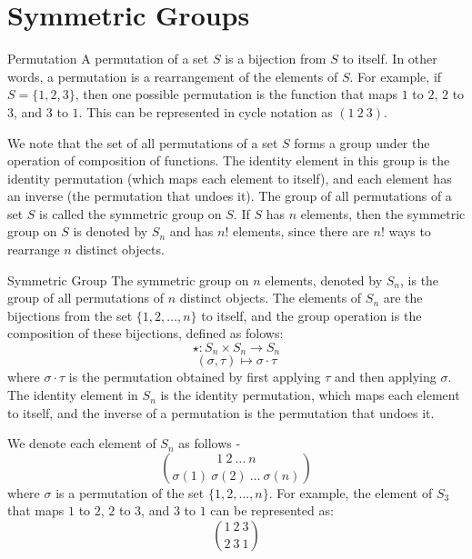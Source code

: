 \documentclass[openany]{book}
\begin{document}
\section{Symmetric Groups}
\begin{mydefinition}{Permutation}
    A permutation of a set \( S \) is a bijection from \( S \) to itself. In other words, a permutation is a rearrangement of the elements of \( S \). For example, if \( S = \{1, 2, 3\} \), then one possible permutation is the function that maps \( 1 \) to \( 2 \), \( 2 \) to \( 3 \), and \( 3 \) to \( 1 \). This can be represented in cycle notation as \( (1\ 2\ 3) \).
\end{mydefinition}
We note that the set of all permutations of a set \( S \) forms a group under the operation of composition of functions. The identity element in this group is the identity permutation (which maps each element to itself), and each element has an inverse (the permutation that undoes it). The group of all permutations of a set \( S \) is called the symmetric group on \( S \). If \( S \) has \( n \) elements, then the symmetric group on \( S \) is denoted by \( S_n \) and has \( n! \) elements, since there are \( n! \) ways to rearrange \( n \) distinct objects.
\begin{mydefinition}{Symmetric Group}
    The symmetric group on \( n \) elements, denoted by \( S_n \), is the group of all permutations of \( n \) distinct objects. The elements of \( S_n \) are the bijections from the set \( \{1, 2, \ldots, n\} \) to itself, and the group operation is the composition of these bijections, defined as folows:
    $$\star : S_n \times S_n \to S_n$$
    $$(\sigma, \tau) \mapsto \sigma \cdot \tau$$
    where \( \sigma \cdot \tau \) is the permutation obtained by first applying \( \tau \) and then applying \( \sigma \). The identity element in \( S_n \) is the identity permutation, which maps each element to itself, and the inverse of a permutation is the permutation that undoes it.
\end{mydefinition}
We denote each element of \( S_n \) as follows - 
$${1\ 2\ \ldots\ n} \choose {\sigma(1)\ \sigma(2)\ \ldots\ \sigma(n)}$$
where \( \sigma \) is a permutation of the set \( \{1, 2, \ldots, n\} \). For example, the element of \( S_3 \) that maps \( 1 \) to \( 2 \), \( 2 \) to \( 3 \), and \( 3 \) to \( 1 \) can be represented as:
$${1\ 2\ 3} \choose {2\ 3\ 1}$$
\end{document}
